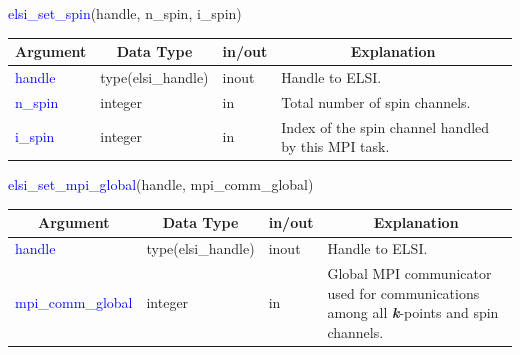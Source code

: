 \documentclass{report}
\begin{document}
\begin{labeling}{\hspace{6cm}}
\item [\hspace{0.3cm} \textcolor{blue}{elsi\_set\_spin}(handle, n\_spin, i\_spin)]
\end{labeling}

\begin{tabular}[]{|p{30mm}|p{30mm}|p{15mm}|p{90mm}|}
\hline
\multicolumn{1}{|c|}{\textbf{Argument}} & \multicolumn{1}{c|}{\textbf{Data Type}} & \multicolumn{1}{c|}{\textbf{in/out}} & \multicolumn{1}{c|}{\textbf{Explanation}}\\
\hline
\textcolor{blue}{handle}  & type(elsi\_handle) & inout & Handle to ELSI.\\
\hline
\textcolor{blue}{n\_spin} & integer            & in    & Total number of spin channels.\\
\hline
\textcolor{blue}{i\_spin} & integer            & in    & Index of the spin channel handled by this MPI task.\\
\hline
\end{tabular}

\begin{labeling}{\hspace{6cm}}
\item [\hspace{0.3cm} \textcolor{blue}{elsi\_set\_mpi\_global}(handle, mpi\_comm\_global)]
\end{labeling}

\begin{tabular}[]{|p{30mm}|p{30mm}|p{15mm}|p{90mm}|}
\hline
\multicolumn{1}{|c|}{\textbf{Argument}} & \multicolumn{1}{c|}{\textbf{Data Type}} & \multicolumn{1}{c|}{\textbf{in/out}} & \multicolumn{1}{c|}{\textbf{Explanation}}\\
\hline
\textcolor{blue}{handle}            & type(elsi\_handle) & inout & Handle to ELSI.\\
\hline
\textcolor{blue}{mpi\_comm\_global} & integer            & in    & Global MPI communicator used for communications among all \textbf{\textit{k}}-points and spin channels.\\
\hline
\end{tabular}
\end{document}
